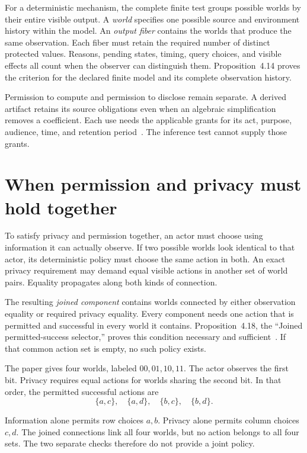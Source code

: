 \documentclass{momentum}
\begin{document}
For a deterministic mechanism, the complete finite test groups possible worlds by their entire visible output.
A \emph{world} specifies one possible source and environment history within the model.
An \emph{output fiber} contains the worlds that produce the same observation.
Each fiber must retain the required number of distinct protected values.
Reasons, pending states, timing, query choices, and visible effects all count when the observer can distinguish them.
Proposition~4.14 proves the criterion for the declared finite model and its complete observation history.

Permission to compute and permission to disclose remain separate.
A derived artifact retains its source obligations even when an algebraic simplification removes a coefficient.
Each use needs the applicable grants for its act, purpose, audience, time, and retention period~\cite[Section~4.10]{sjn}.
The inference test cannot supply those grants.

\section{When permission and privacy must hold together}
\label{sec:joined}

To satisfy privacy and permission together, an actor must choose using information it can actually observe.
If two possible worlds look identical to that actor, its deterministic policy must choose the same action in both.
An exact privacy requirement may demand equal visible actions in another set of world pairs.
Equality propagates along both kinds of connection.

The resulting \emph{joined component} contains worlds connected by either observation equality or required privacy equality.
Every component needs one action that is permitted and successful in every world it contains.
Proposition~4.18, the ``Joined permitted-success selector,'' proves this condition necessary and sufficient~\cite[Section~4.11]{sjn}.
If that common action set is empty, no such policy exists.

The paper gives four worlds, labeled $00,01,10,11$.
The actor observes the first bit.
Privacy requires equal actions for worlds sharing the second bit.
In that order, the permitted successful actions are
\[
 \{a,c\},\quad\{a,d\},\quad\{b,c\},\quad\{b,d\}.
\]

Information alone permits row choices $a,b$.
Privacy alone permits column choices $c,d$.
The joined connections link all four worlds, but no action belongs to all four sets.
The two separate checks therefore do not provide a joint policy.
\end{document}
